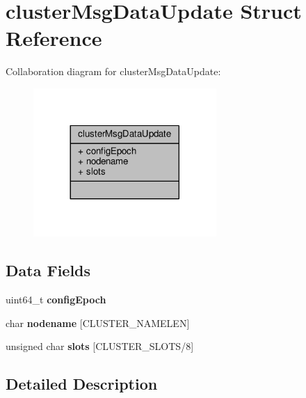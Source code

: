 \hypertarget{structclusterMsgDataUpdate}{}\section{cluster\+Msg\+Data\+Update Struct Reference}
\label{structclusterMsgDataUpdate}


Collaboration diagram for cluster\+Msg\+Data\+Update\+:\nopagebreak
\begin{figure}[H]
\begin{center}
\leavevmode
\includegraphics[width=197pt]{structclusterMsgDataUpdate__coll__graph}
\end{center}
\end{figure}
\subsection*{Data Fields}
\begin{DoxyCompactItemize}
\item 
\mbox{\label{structclusterMsgDataUpdate_a5ccb48f1cbc2d86aa6665a3d91797fc5}} 
uint64\+\_\+t {\bfseries config\+Epoch}
\item 
\mbox{\label{structclusterMsgDataUpdate_a506cd14d4ff4d1584e382b98abfed01d}} 
char {\bfseries nodename} \mbox{[}C\+L\+U\+S\+T\+E\+R\+\_\+\+N\+A\+M\+E\+L\+EN\mbox{]}
\item 
\mbox{\label{structclusterMsgDataUpdate_ad644b488baff5a80184da68dd96234bb}} 
unsigned char {\bfseries slots} \mbox{[}C\+L\+U\+S\+T\+E\+R\+\_\+\+S\+L\+O\+TS/8\mbox{]}
\end{DoxyCompactItemize}


\subsection{Detailed Description}


